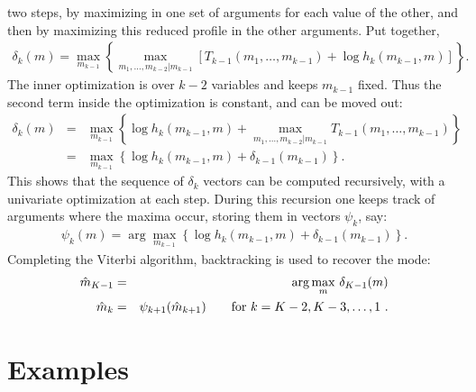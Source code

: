 two steps, by maximizing in one set of arguments for each value of
the other, and then by maximizing this reduced profile in the other
arguments. Put together,
\begin{eqnarray*}
\delta_k(m) = \max_{m_{k-1}} \left\{ \max_{m_1, \ldots, m_{k-2} | m_{k-1} } 
 \left[  T_{k-1}(m_1, \ldots, m_{k-1}) + \log h_k(m_{k-1},m) \right] \right\}.
\end{eqnarray*}
The inner optimization is over $k-2$ variables and keeps $m_{k-1}$ fixed.
Thus the second term inside the optimization is constant, and can be 
moved out:
\begin{eqnarray*}
\delta_k(m) & = & 
  \max_{m_{k-1}} \left\{  \log h_k( m_{k-1} , m) +
  \max_{m_1, \ldots, m_{k-2} | m_{k-1} } 
   T_{k-1}(m_1, \ldots, m_{k-1})  \right\} \\
 & = & \max_{m_{k-1}} \left\{  \log h_k( m_{k-1} , m) +
       \delta_{k-1}( m_{k-1} )  \right\}. 
\end{eqnarray*}
This shows that the sequence of $\delta_k$ vectors can be computed recursively,
with a univariate optimization at each step.  During this recursion one
keeps track of arguments where the maxima occur, storing them in
vectors $\psi_k$, say:
\begin{eqnarray*}
\psi_k(m) = \arg\max_{ m_{k-1} } \left\{  \log h_k( m_{k-1} , m) +
       \delta_{k-1}( m_{k-1} )  \right\}. 
\end{eqnarray*}
Completing the Viterbi algorithm,
 backtracking is used to recover the mode:
\begin{eqnarray*}
\hat m_{K-1} &=&\arg\max_m \, \delta_{K-1} (m) \\
 \hat m_{k} &=& \psi_{k+1}( \hat m_{k+1} )\qquad
 {\mbox {\rm for $k = K-2, K-3, \ldots, 1$ }}.
\end{eqnarray*}

\section{Examples}

